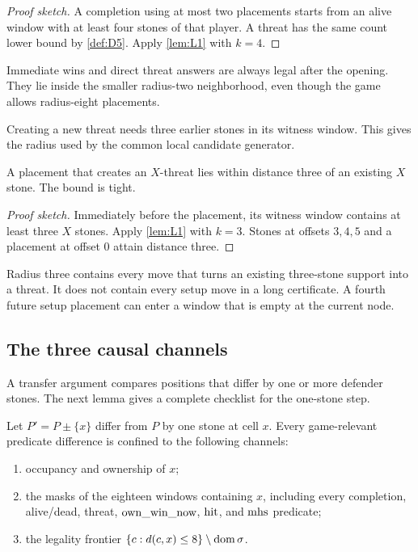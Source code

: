 \begin{proof}[Proof sketch]
A completion using at most two placements starts from an alive window with at
least four stones of that player.  A threat has the same count lower bound by
\cref{def:D5}.  Apply \cref{lem:L1} with $k=4$.
\end{proof}

\begin{plainterms}
Immediate wins and direct threat answers are always legal after the opening.
They lie inside the smaller radius-two neighborhood, even though the game
allows radius-eight placements.
\end{plainterms}

Creating a new threat needs three earlier stones in its witness window.  This
gives the radius used by the common local candidate generator.

\begin{theorem}
\label{thm:T2}
A placement that creates an $X$-threat lies within distance three of an
existing $X$ stone.  The bound is tight.
\end{theorem}

\begin{proof}[Proof sketch]
Immediately before the placement, its witness window contains at least three
$X$ stones.  Apply \cref{lem:L1} with $k=3$.  Stones at offsets $3,4,5$ and a
placement at offset $0$ attain distance three.
\end{proof}

\begin{plainterms}
Radius three contains every move that turns an existing three-stone support
into a threat.  It does not contain every setup move in a long certificate.
A fourth future setup placement can enter a window that is empty at the
current node.
\end{plainterms}

\subsection{The three causal channels}

A transfer argument compares positions that differ by one or more defender
stones.  The next lemma gives a complete checklist for the one-stone step.

\begin{lemma}
\label{lem:L3}
Let $P'=P\mathbin{\pm}\{x\}$ differ from $P$ by one stone at cell $x$.  Every
game-relevant predicate difference is confined to the following channels:
\begin{enumerate}[label=\textup{(C\arabic*)}]
  \item occupancy and ownership of $x$;
  \item the masks of the eighteen windows containing $x$, including every
  completion, alive/dead, threat, $\operatorname{own\_win\_now}$, $\operatorname{hit}$, and $\operatorname{mhs}$ predicate;
  \item the legality frontier
  $\{c:d(c,x)\le8\}\setminus\operatorname{dom}\sigma$.
\end{enumerate}
\end{lemma}

